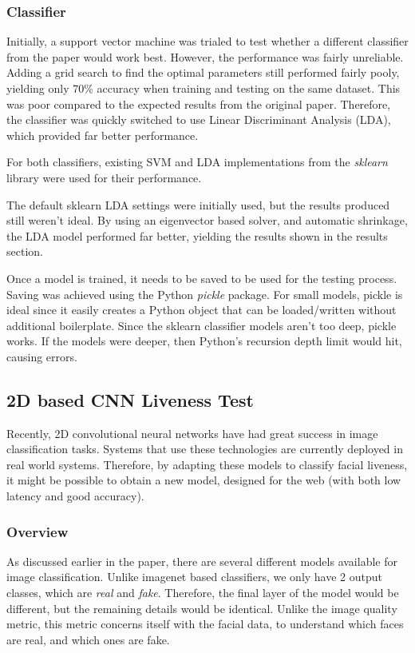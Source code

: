 \documentclass[11pt,a4paper]{article}
\begin{document}
        \subsubsection{Classifier}
            Initially, a support vector machine was trialed to test whether a different classifier from the paper \cite{ImageQualityAssessmentTest} would work best. However,
            the performance was fairly unreliable. Adding a grid search to find the optimal parameters still performed fairly pooly, yielding only 70\% accuracy when training and testing on the same dataset. This was poor compared to the expected results from the original paper. Therefore, the classifier was quickly switched to
            use Linear Discriminant Analysis (LDA), which provided far better performance.

            For both classifiers, existing SVM and LDA implementations from the \emph{sklearn} library were used for their performance. 
            
            The default sklearn LDA settings were initially used, but the results produced still weren't ideal. By using an eigenvector based solver, and automatic shrinkage, the LDA model performed far better, yielding the results
            shown in the results section.

            Once a model is trained, it needs to be saved to be used for the testing process. Saving was achieved using the Python \emph{pickle} package. For small models, pickle is ideal since it easily creates a Python object that can be loaded/written
            without additional boilerplate. Since the sklearn classifier models aren't too deep, pickle works. If the models were deeper, then Python's recursion depth limit would hit, causing errors. 
     
            
        \subsection{2D based CNN Liveness Test}
        Recently, 2D convolutional neural networks have had great success in image classification tasks. Systems that use these technologies are currently deployed in real world systems.
        Therefore, by adapting these models to classify facial liveness, it might be possible to obtain a new model, designed for the web (with both low latency and good accuracy).
        
            \subsubsection{Overview}
                As discussed earlier in the paper, there are several different models available for image classification. Unlike imagenet based classifiers, we only have 2 output classes, which are \emph{real} and \emph{fake}.
                Therefore, the final layer of the model would be different, but the remaining details would be identical. Unlike the image quality metric, this metric concerns itself with the facial data, to understand which faces
                are real, and which ones are fake.
\end{document}
